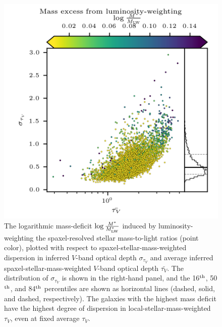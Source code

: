 \begin{figure}
    \centering
    \includegraphics[width=\columnwidth]{mean+stdtauV_dMglobloc}
    \caption[Mass deficit induced by luminosity-weighted stacking]{\fixspacing The logarithmic mass-deficit $\log{ \frac{M^*}{M^*_{\rm LW}} }$ induced by luminosity-weighting the spaxel-resolved stellar mass-to-light ratios (point color), plotted with respect to spaxel-stellar-mass-weighted dispersion in inferred $V$-band optical depth $\sigma_{\tau_V}$ and average inferred spaxel-stellar-mass-weighted $V$-band optical depth $\bar{\tau_V}$. The distribution of $\sigma_{\tau_V}$ is shown in the right-hand panel, and the 16$^{\rm th}$, 50$^{\rm th}$, and 84$^{\rm th}$ percentiles are shown as horizontal lines (dashed, solid, and dashed, respectively). The galaxies with the highest mass deficit have the highest degree of dispersion in local-stellar-mass-weighted $\tau_V$, even at fixed average $\tau_V$.}
    \label{fig:meantauV_dMglobloc_stdtauV}
\end{figure}

